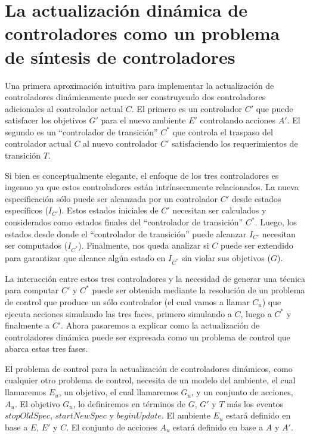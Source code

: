 \section{La actualización dinámica de controladores como un problema de síntesis de controladores}

Una primera aproximación intuitiva para implementar la actualización de controladores dinámicamente puede ser
construyendo dos controladores adicionales al controlador actual $C$. El primero es un controlador $C'$ que puede
satisfacer los objetivos $G'$ para el nuevo ambiente $E'$ controlando acciones $A'$. El segundo es un ``controlador de
transición'' $C^*$ que controla el traspaso del controlador actual $C$ al nuevo controlador $C'$ satisfaciendo los
requerimientos de transición $T$.

Si bien es conceptualmente elegante, el enfoque de los tres controladores es ingenuo ya que estos controladores están
intrínsecamente relacionados. La nueva especificación sólo puede ser alcanzada por un controlador $C'$ desde estados
específicos ($I_{C'}$). Estos estados iniciales de $C'$ necesitan ser calculados y considerados como estados finales del
``controlador de transición'' $C^*$. Luego, los estados desde donde el ``controlador de transición'' puede alcanzar
$I_{C'}$ necesitan ser computados ($I_{C^*}$). Finalmente, nos queda analizar si $C$ puede ser extendido para
garantizar que alcance algún estado en $I_{C^*}$ sin violar sus objetivos ($G$).

La interacción entre estos tres controladores y la necesidad de generar una técnica para computar $C'$ y $C^*$ puede ser
obtenida mediante la resolución de un problema de control que produce un sólo controlador (el cual vamos a llamar $C_u$)
que ejecuta acciones simulando las tres faces, primero simulando a $C$, luego a $C^*$ y finalmente a $C'$. Ahora
pasaremos a explicar como la actualización de controladores dinámica puede ser expresada como un problema de control que
abarca estas tres fases.

El problema de control para la actualización de controladores dinámicos, como cualquier otro problema de control,
necesita de un modelo del ambiente, el cual llamaremos $E_u$, un objetivo, el cual llamaremos $G_u$, y un conjunto de
acciones, $A_u$. El objetivo $G_u$, lo definiremos en términos de $G$, $G'$ y $T$ más los eventos $stopOldSpec$,
$startNewSpec$ y $beginUpdate$. El ambiente $E_u$ estará definido en base a $E$, $E'$ y $C$. El conjunto de acciones
$A_u$ estará definido en base a $A$ y $A'$.

